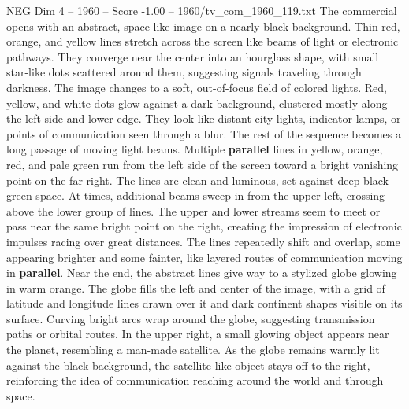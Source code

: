 \begin{textsample}{NEG Dim 4 – 1960 – Score -1.00 – 1960/tv\_com\_1960\_119.txt}  \label{ex:f4_neg_035}
The commercial opens with an abstract, space-like image on a nearly black background.
Thin red, orange, and yellow lines stretch across the screen like beams of light or electronic pathways.
They converge near the center into an hourglass shape, with small star-like dots scattered around them, suggesting signals traveling through darkness.
The image changes to a soft, out-of-focus field of colored lights.
Red, yellow, and white dots glow against a dark background, clustered mostly along the left side and lower edge.
They look like distant city lights, indicator lamps, or points of communication seen through a blur.
The rest of the sequence becomes a long passage of moving light beams.
Multiple \textbf{parallel} lines in yellow, orange, red, and pale green run from the left side of the screen toward a bright vanishing point on the far right.
The lines are clean and luminous, set against deep black-green space.
At times, additional beams sweep in from the upper left, crossing above the lower group of lines.
The upper and lower streams seem to meet or pass near the same bright point on the right, creating the impression of electronic impulses racing over great distances.
The lines repeatedly shift and overlap, some appearing brighter and some fainter, like layered routes of communication moving in \textbf{parallel}.
Near the end, the abstract lines give way to a stylized globe glowing in warm orange.
The globe fills the left and center of the image, with a grid of latitude and longitude lines drawn over it and dark continent shapes visible on its surface.
Curving bright arcs wrap around the globe, suggesting transmission paths or orbital routes.
In the upper right, a small glowing object appears near the planet, resembling a man-made satellite.
As the globe remains warmly lit against the black background, the satellite-like object stays off to the right, reinforcing the idea of communication reaching around the world and through space.

\end{textsample}
